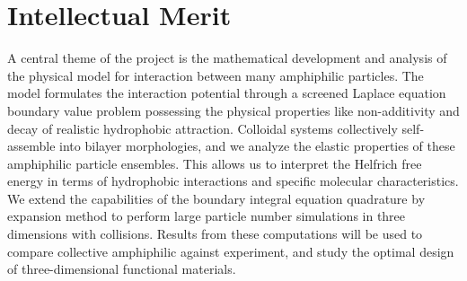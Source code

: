 \section{Intellectual Merit}
A central theme of the project is the mathematical development and
analysis of the physical model for interaction between many amphiphilic
particles. The model formulates the interaction potential through a
screened Laplace equation boundary value problem possessing the physical
properties like non-additivity and decay of realistic hydrophobic
attraction. Colloidal systems collectively self-assemble into bilayer
morphologies, and we analyze the elastic properties of these amphiphilic
particle ensembles. This allows us to interpret the Helfrich free
energy in terms of hydrophobic interactions and specific molecular
characteristics. We extend the capabilities of the boundary integral
equation quadrature by expansion method to perform large particle number
simulations in three dimensions with collisions. Results from these
computations will be used to compare collective amphiphilic against
experiment, and study the optimal design of three-dimensional
functional materials. 



